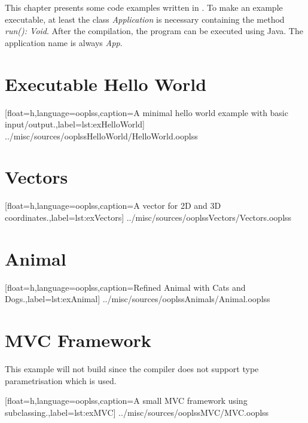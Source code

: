 This chapter presents some code examples written in \ooplss.  To make an
example executable, at least the class \emph{Application} is necessary
containing the method \emph{run(): Void}. After the compilation, the program
can be executed using Java. The application name is always \emph{App}.

\section{Executable Hello World}

[float=h,language=ooplss,caption=A minimal hello world example with basic input/output.,label=lst:exHelloWorld]
{../misc/sources/ooplssHelloWorld/HelloWorld.ooplss}

\newpage
\section{Vectors}

[float=h,language=ooplss,caption=A vector for 2D and 3D coordinates.,label=lst:exVectors]
{../misc/sources/ooplssVectors/Vectors.ooplss}

\newpage
\section{Animal}

[float=h,language=ooplss,caption=Refined Animal with Cats and Dogs.,label=lst:exAnimal]
{../misc/sources/ooplssAnimals/Animal.ooplss}

\newpage
\section{MVC Framework}
This example will not build since the compiler does not support
type parametrisation which is used.


[float=h,language=ooplss,caption=A small MVC framework using subclassing.,label=lst:exMVC]
{../misc/sources/ooplssMVC/MVC.ooplss}
